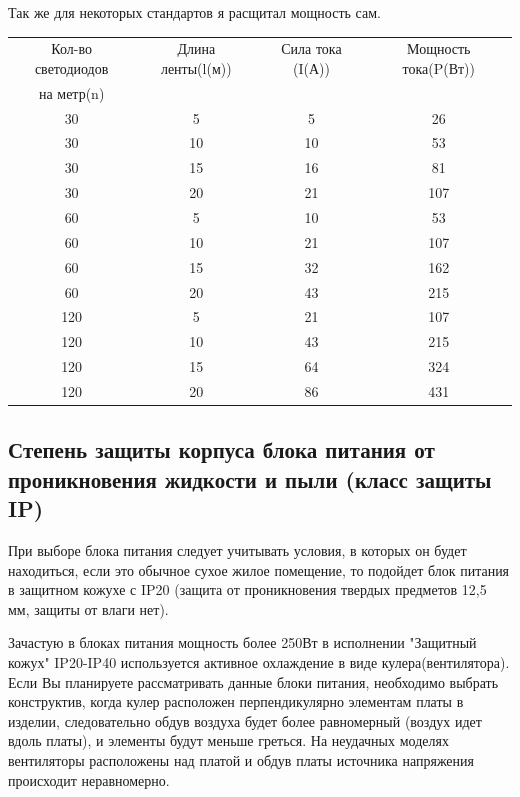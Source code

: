 \documentclass[a4paper, 12pt]{article}
\begin{document}
Так же для некоторых стандартов я расщитал мощность сам.

\begin{table}[H]
    \begin{center}
    \begin{tabular}{|c|c|c|c|}
    \hline
    Кол-во светодиодов & Длина ленты(l(м)) & Сила тока (I(А))& Мощность тока(P(Вт)) \\
    на метр(n)&&&\\
    \hline
     30 &  5 &  5 &  26\\
     30 & 10 & 10 &  53\\
     30 & 15 & 16 &  81\\
     30 & 20 & 21 & 107\\
     \hline
     60 &  5 & 10 &  53\\
     60 & 10 & 21 & 107\\
     60 & 15 & 32 & 162\\
     60 & 20 & 43 & 215\\
     \hline
    120 &  5 & 21 & 107\\
    120 & 10 & 43 & 215\\
    120 & 15 & 64 & 324\\
    120 & 20 & 86 & 431\\
    \hline
    \end{tabular}
    \end{center}
\end{table}

\subsection{Степень защиты корпуса блока питания от проникновения жидкости и пыли (класс защиты IP)}

При выборе блока питания следует учитывать условия, в которых он будет 
находиться, если это обычное сухое жилое помещение, то подойдет блок питания в 
защитном кожухе с IP20 (защита от проникновения твердых предметов 12,5 мм, 
защиты от влаги нет).

Зачастую в блоках питания мощность более 250Вт в исполнении "Защитный кожух" 
IP20-IP40 используется активное охлаждение в виде кулера(вентилятора). Если Вы 
планируете рассматривать данные блоки питания, необходимо выбрать конструктив, 
когда кулер расположен перпендикулярно элементам платы в изделии, следовательно
обдув воздуха будет более равномерный (воздух идет вдоль платы), и элементы 
будут меньше греться. На неудачных моделях вентиляторы расположены над платой 
и обдув платы источника напряжения происходит неравномерно.
\end{document}
